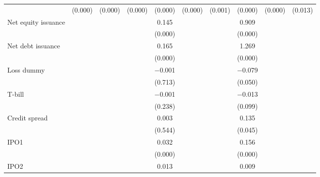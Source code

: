 \begin{longtable}{l*{9}{c}}
                    &     (0.000)&     (0.000)&     (0.000)&     (0.000)&     (0.000)&     (0.001)&     (0.000)&     (0.000)&     (0.013)\\
\addlinespace
Net equity issuance &            &            &            &       0.145&            &            &       0.909&            &            \\
                    &            &            &            &     (0.000)&            &            &     (0.000)&            &            \\
\addlinespace
Net debt issuance   &            &            &            &       0.165&            &            &       1.269&            &            \\
                    &            &            &            &     (0.000)&            &            &     (0.000)&            &            \\
\addlinespace
Loss dummy          &            &            &            &    $-$0.001&            &            &    $-$0.079&            &            \\
                    &            &            &            &     (0.713)&            &            &     (0.050)&            &            \\
\addlinespace
T-bill              &            &            &            &    $-$0.001&            &            &    $-$0.013&            &            \\
                    &            &            &            &     (0.238)&            &            &     (0.099)&            &            \\
\addlinespace
Credit spread       &            &            &            &       0.003&            &            &       0.135&            &            \\
                    &            &            &            &     (0.544)&            &            &     (0.045)&            &            \\
\addlinespace
IPO1                &            &            &            &       0.032&            &            &       0.156&            &            \\
                    &            &            &            &     (0.000)&            &            &     (0.000)&            &            \\
\addlinespace
IPO2                &            &            &            &       0.013&            &            &       0.009&            &            \\

\end{longtable}
